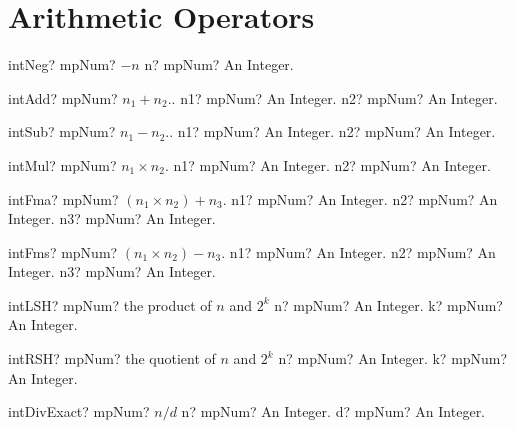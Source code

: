 \documentclass[12pt,a4paper,openany]{book}
\begin{document}
\section{Arithmetic Operators }

\begin{mpFunctionsExtract}
\mpFunctionOne
{intNeg? mpNum?  $-n$}
{n? mpNum? An Integer.}
\end{mpFunctionsExtract}

\begin{mpFunctionsExtract}
\mpFunctionTwo
{intAdd? mpNum?  $n_1 + n_2.$.}
{n1? mpNum? An Integer.}
{n2? mpNum? An Integer.}
\end{mpFunctionsExtract}

\begin{mpFunctionsExtract}
\mpFunctionTwo
{intSub? mpNum?  $n_1 - n_2.$.}
{n1? mpNum? An Integer.}
{n2? mpNum? An Integer.}
\end{mpFunctionsExtract}

\begin{mpFunctionsExtract}
\mpFunctionTwo
{intMul? mpNum?  $n_1  \times n_2$.}
{n1? mpNum? An Integer.}
{n2? mpNum? An Integer.}
\end{mpFunctionsExtract}

\begin{mpFunctionsExtract}
\mpFunctionThree
{intFma? mpNum? $(n_1 \times n_2) + n_3$.}
{n1? mpNum? An Integer.}
{n2? mpNum? An Integer.}
{n3? mpNum? An Integer.}
\end{mpFunctionsExtract}

\begin{mpFunctionsExtract}
\mpFunctionThree
{intFms? mpNum? $(n_1 \times n_2) - n_3$.}
{n1? mpNum? An Integer.}
{n2? mpNum? An Integer.}
{n3? mpNum? An Integer.}
\end{mpFunctionsExtract}

\begin{mpFunctionsExtract}
\mpFunctionTwo
{intLSH? mpNum? the product of $n$ and $2^k$}
{n? mpNum? An Integer.}
{k? mpNum? An Integer.}
\end{mpFunctionsExtract}

\begin{mpFunctionsExtract}
\mpFunctionTwo
{intRSH? mpNum? the quotient of $n$ and $2^k$}
{n? mpNum? An Integer.}
{k? mpNum? An Integer.}
\end{mpFunctionsExtract}

\begin{mpFunctionsExtract}
\mpFunctionTwo
{intDivExact? mpNum? $n/d$}
{n? mpNum? An Integer.}
{d? mpNum? An Integer.}
\end{mpFunctionsExtract}
\end{document}
